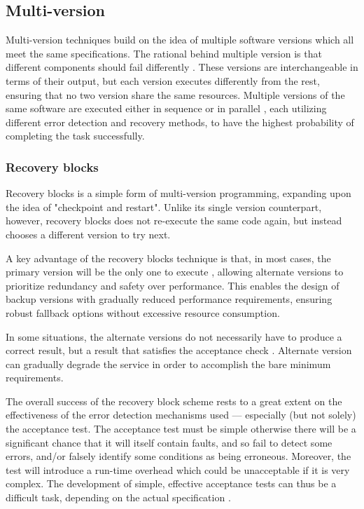 \subsection{Multi-version} \label{multi}

Multi-version techniques build on the idea of multiple software versions which all meet the same specifications. The rational behind multiple version is that different components should fail differently \cite{nasa:sft}.
These versions are interchangeable in terms of their output, but each version executes differently from the rest, ensuring that no two version share the same resources.
Multiple versions of the same software are executed either in sequence or in parallel \cite{nasa:sft}, each utilizing different error detection and recovery methods, to have the highest probability of completing the task successfully.

\subsubsection{Recovery blocks}

Recovery blocks \cite{lyu:sft} is a simple form of multi-version programming, expanding upon the idea of "checkpoint and restart". Unlike its single version counterpart, however, recovery blocks does not re-execute the same code again, but instead chooses a different version to try next.

A key advantage of the recovery blocks technique is that, in most cases, the primary version will be the only one to execute \cite{lyu:sft}, allowing alternate versions to prioritize redundancy and safety over performance. This enables the design of backup versions with gradually reduced performance requirements, ensuring robust fallback options without excessive resource consumption.



In some situations, the alternate versions do not necessarily have to produce a correct result, but a result that satisfies the acceptance check \cite{lyu:sft}. Alternate version can gradually degrade the service in order to accomplish the bare minimum requirements.

The overall success of the recovery block scheme rests to a great extent on the effectiveness of the error detection mechanisms used — especially (but not solely) the acceptance test. The acceptance test must be simple otherwise there will be a significant chance that it will itself contain faults, and so fail to detect some errors, and/or falsely identify some conditions as being erroneous. Moreover, the test will introduce a run-time overhead which could be unacceptable if it is very complex. The development of simple, effective acceptance tests can thus be a difficult task, depending on the actual specification \cite{lyu:sft}.


